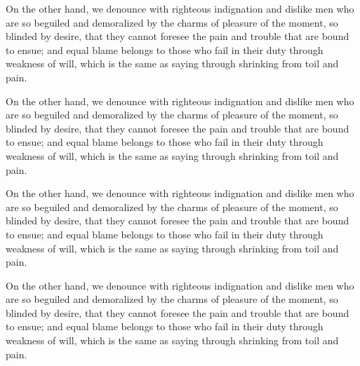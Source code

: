 On the other hand, we denounce with righteous indignation and dislike men who
are so beguiled and demoralized by the charms of pleasure of the moment, so
blinded by desire, that they cannot foresee the pain and trouble that are bound
to ensue; and equal blame belongs to those who fail in their duty through
weakness of will, which is the same as saying through shrinking from toil and
pain.

On the other hand, we denounce with righteous indignation and dislike men who
are so beguiled and demoralized by the charms of pleasure of the moment, so
blinded by desire, that they cannot foresee the pain and trouble that are bound
to ensue; and equal blame belongs to those who fail in their duty through
weakness of will, which is the same as saying through shrinking from toil and
pain.


On the other hand, we denounce with righteous indignation and dislike men who
are so beguiled and demoralized by the charms of pleasure of the moment, so
blinded by desire, that they cannot foresee the pain and trouble that are bound
to ensue; and equal blame belongs to those who fail in their duty through
weakness of will, which is the same as saying through shrinking from toil and
pain.

On the other hand, we denounce with righteous indignation and dislike men who
are so beguiled and demoralized by the charms of pleasure of the moment, so
blinded by desire, that they cannot foresee the pain and trouble that are bound
to ensue; and equal blame belongs to those who fail in their duty through
weakness of will, which is the same as saying through shrinking from toil and
pain.

